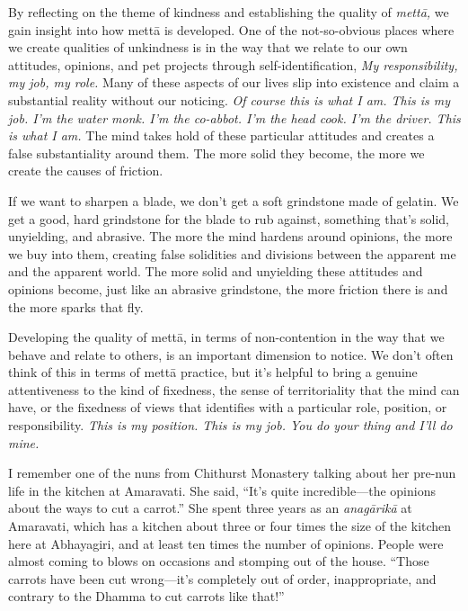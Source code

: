 
By reflecting on the theme of kindness and establishing the quality of 
\emph{mettā,} we gain insight into how mettā is developed. One of the 
not-so-obvious places where we create qualities of unkindness is in the 
way that we relate to our own attitudes, opinions, and pet projects 
through self-identification, \emph{My responsibility, my job, my role.} 
Many of these aspects of our lives slip into existence and claim a 
substantial reality without our noticing. \emph{Of course this is what 
I am. This is my job. I'm the water monk. I'm the co-abbot. I'm the 
head cook. I'm the driver. This is what I am.} The mind takes hold of 
these particular attitudes and creates a false substantiality around 
them. The more solid they become, the more we create the causes of 
friction.

If we want to sharpen a blade, we don't get a soft grindstone made of 
gelatin. We get a good, hard grindstone for the blade to rub against, 
something that's solid, unyielding, and abrasive. The more the mind 
hardens around opinions, the more we buy into them, creating false 
solidities and divisions between the apparent me and the apparent 
world. The more solid and unyielding these attitudes and opinions 
become, just like an abrasive grindstone, the more friction there is 
and the more sparks that fly.

Developing the quality of mettā, in terms of non-contention in the way 
that we behave and relate to others, is an important dimension to 
notice. We don't often think of this in terms of mettā practice, but 
it's helpful to bring a genuine attentiveness to the kind of fixedness, 
the sense of territoriality that the mind can have, or the fixedness of 
views that identifies with a particular role, position, or 
responsibility. \emph{This is my position. This is my job. You do your 
thing and I'll do mine.}

I remember one of the nuns from Chithurst Monastery talking about her 
pre-nun life in the kitchen at Amaravati. She said, ``It's quite 
incredible---the opinions about the ways to cut a carrot.'' She spent 
three years as an \emph{anagārikā} at Amaravati, which has a kitchen 
about three or four times the size of the kitchen here at Abhayagiri, 
and at least ten times the number of opinions. People were almost 
coming to blows on occasions and stomping out of the house. ``Those 
carrots have been cut wrong---it's completely out of order, 
inappropriate, and contrary to the Dhamma to cut carrots like that!''

